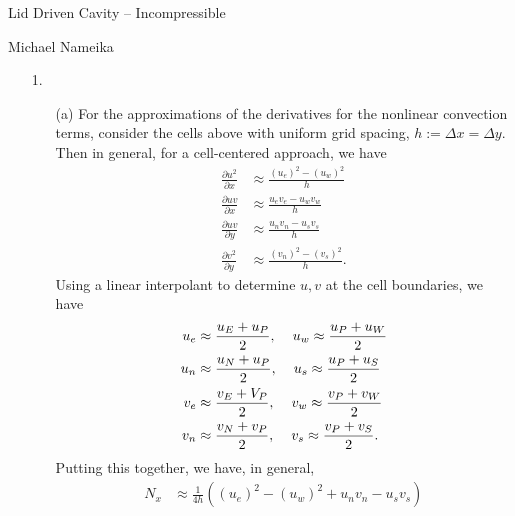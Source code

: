 \documentclass{article}
\begin{document}
\begin{center}
    {\huge Lid Driven Cavity -- Incompressible}
    \vspace{0.5cm}
    
    {\large Michael Nameika}
\end{center}

\begin{itemize}
    \item[1.]
    \begin{itemize}
        \item[(a)] For the approximations of the derivatives for the nonlinear convection terms, consider the cells above with uniform grid spacing, $h := \Delta x = \Delta y$. Then in general, for a cell-centered approach, we have
        \begin{align*}
            \frac{\partial u^2}{\partial x} &\approx \frac{(u_e)^2 - (u_w)^2}{h}\\
            \frac{\partial uv}{\partial x} &\approx \frac{u_ev_e - u_wv_w}{h}\\
            \frac{\partial uv}{\partial y} &\approx \frac{u_nv_n - u_sv_s}{h}\\
            \frac{\partial v^2}{\partial y} &\approx \frac{(v_n)^2 - (v_s)^2}{h}.
        \end{align*} 
        Using a linear interpolant to determine $u,v$ at the cell boundaries, we have 
        \begin{equation}
        \label{interps}
            \begin{aligned}
                u_e &\approx \frac{u_E + u_P}{2}, \hspace{0.4cm} u_w \approx \frac{u_P + u_W}{2}\\
                u_n &\approx \frac{u_N + u_P}{2}, \hspace{0.4cm} u_s \approx \frac{u_P + u_S}{2}\\
                v_e &\approx \frac{v_E + V_P}{2}, \hspace{0.4cm} v_w \approx \frac{v_P + v_W}{2}\\
                v_n &\approx \frac{v_N + v_P}{2}, \hspace{0.4cm} v_s \approx \frac{v_P + v_S}{2}.
            \end{aligned}
        \end{equation}
        Putting this together, we have, in general,
        \begin{align*}
            N_x &\approx \frac{1}{4h}\left((u_e)^2 - (u_w)^2 + u_nv_n - u_sv_s\right)\\

\end{align*}
\end{itemize}
\end{itemize}
\end{document}

